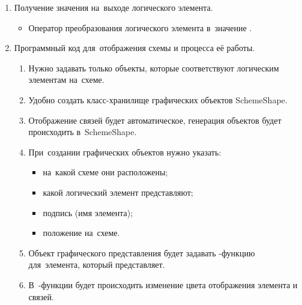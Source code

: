 \begin{enumerate}
    \item Получение значения на~выходе логического элемента.
    \begin{itemize}
        \item Оператор преобразования логического элемента в~значение .
    \end{itemize}

    \item Программный код для~отображения схемы и процесса её работы.
    \begin{enumerate}
        \item Нужно задавать только объекты, которые соответствуют логическим элементам на~схеме.
        \item Удобно создать класс-хранилище графических объектов SchemeShape.
        \item Отображение связей будет автоматическое, генерация объектов будет происходить в~SchemeShape.
        \item При~создании графических объектов нужно указать:
        \begin{itemize}
            \item на~какой схеме они расположены;
            \item какой логический элемент представляют;
            \item подпись (имя элемента);
            \item положение на~схеме.
        \end{itemize}
        \item Объект графического представления будет задавать -функцию для~элемента, который представляет.
        \item В~-функции будет происходить изменение цвета отображения элемента и связей.
    \end{enumerate}
\end{enumerate}



